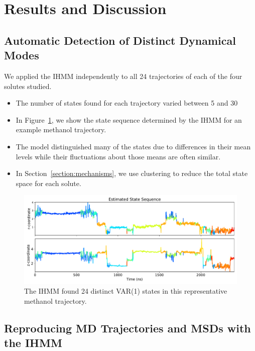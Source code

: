 \documentclass[journal=jpcbfk,manuscript=article]{achemso}
\begin{document}
  \section{Results and Discussion}
  
  \subsection{Automatic Detection of Distinct Dynamical Modes}\label{section:find_modes}
  
  We applied the IHMM independently to all 24 trajectories of each of the four solutes studied.
  \begin{itemize}
    \item The number of states found for each trajectory varied between 5 and 30  %
    \item In Figure~\ref{fig:rz_unclustered}, we show the state sequence determined by the
    IHMM for an example methanol trajectory.
    \item The model distinguished many of the states due to differences in their mean levels 
    while their fluctuations about those means are often similar. 
    \item In Section~\ref{section:mechanisms}, we use clustering to reduce the total state
    space for each solute.    
  \end{itemize}
  
  \begin{figure}
  \centering
  \includegraphics[width=\textwidth]{rz_unclustered_MET.pdf}
  \caption{The IHMM found 24 distinct VAR(1) states in this representative methanol trajectory.}\label{fig:rz_unclustered}
  \end{figure}
  
  \subsection{Reproducing MD Trajectories and MSDs with the IHMM}
\end{document}
